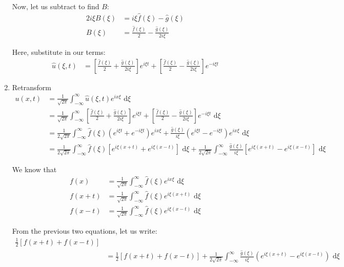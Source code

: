 \begin{enumerate}
  Now, let us subtract to find $B$:
  \begin{align}
    2 i \xi B(\xi) & = i \xi \hat f (\xi) - \hat g (\xi)\\
    B(\xi) & = \frac{\hat f(\xi)}{2} - \frac{\hat g(\xi)}{2 i \xi}
  \end{align}

  Here, substitute in our terms:
  \begin{align}
    \hat u(\xi, t)
    & = \left[ \frac{\hat f(\xi)}{2} + \frac{\hat g(\xi)}{2 i \xi}  \right] e^{i \xi t} + \left[ \frac{\hat f(\xi)}{2} - \frac{\hat g(\xi)}{2 i \xi} \right] e^{-i \xi t}
  \end{align}

  \item Retransform
  \begin{align}
    u(x, t)
    & = \frac{1}{\sqrt{2 \pi}} \int^\infty_{-\infty} \hat u(\xi, t) e^{i x \xi} \text{ d}\xi\\
    & = \frac{1}{\sqrt{2 \pi}} \int^\infty_{-\infty} \left[ \frac{\hat f(\xi)}{2} + \frac{\hat g(\xi)}{2 i \xi}  \right] e^{i \xi t} + \left[ \frac{\hat f(\xi)}{2} - \frac{\hat g(\xi)}{2 i \xi} \right] e^{-i \xi t} \text{ d}\xi\\
    & =
    \frac{1}{2 \sqrt{2 \pi}} \int^\infty_{-\infty}
    \hat f(\xi)
    \left(e^{i \xi t} + e^{-i \xi t}\right)e^{i x \xi} +
    \frac{\hat g(\xi)}{i \xi}
    \left( e^{i \xi t} - e^{-i \xi t} \right)e^{i x \xi} \text{ d}\xi\\
    & =
    \frac{1}{2 \sqrt{2 \pi}} \int^\infty_{-\infty}
    \hat f(\xi) \left[ e^{i \xi(x + t)} + e^{i \xi(x - t)} \right] \text{ d}\xi
    + \frac{1}{2 \sqrt{2 \pi}} \int^\infty_{-\infty}
    \frac{\hat g(\xi)}{i \xi}
    \left[ e^{i \xi(x + t)} - e^{i \xi(x - t)} \right] \text{ d}\xi
  \end{align}

  We know that
  \begin{align}
    f(x) & = \frac{1}{\sqrt{2 \pi}} \int^\infty_{-\infty} \hat f(\xi) e^{i x \xi} \text{ d}\xi\\
    f(x + t) & = \frac{1}{\sqrt{2 \pi}} \int^\infty_{-\infty} \hat f(\xi) e^{i \xi(x + t)} \text{ d}\xi\\
    f(x - t) & = \frac{1}{\sqrt{2 \pi}} \int^\infty_{-\infty} \hat f(\xi) e^{i \xi(x - t)} \text{ d}\xi
  \end{align}

  From the previous two equations, let us write:
  \begin{align}
    \frac{1}{2} \left[ f(x + t) + f(x - t) \right]\\
    & = \frac{1}{2} \left[ f(x + t) + f(x - t) \right] +
    \frac{1}{2 \sqrt{2 \pi}} \int^\infty_{-\infty} \frac{\hat g(\xi)}{i \xi} \left( e^{i \xi(x + t)} - e^{i \xi(x - t)} \right) \text{ d}\xi
  \end{align}


\end{enumerate}
